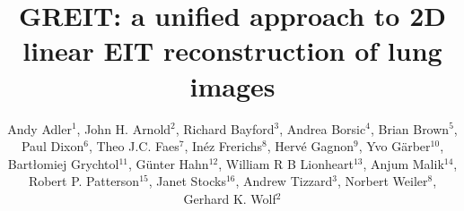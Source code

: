 \documentclass[12pt]{iopart}
\begin{document}
\title[GREIT: linear EIT image reconstruction]{%
GREIT: a unified approach to 2D linear EIT reconstruction of
       lung images
}

\author{Andy Adler$^{1}$,
        John H. Arnold$^{2}$,
        Richard Bayford$^{3}$,
        Andrea Borsic$^{4}$,
        Brian Brown$^{5}$,
        Paul Dixon$^{6}$,
        Theo J.C. Faes$^{7}$,
        In\'ez Frerichs$^{8}$,
        Herv\'e Gagnon$^{9}$,
        Yvo G\"arber$^{10}$,
        Bart\l{}omiej Grychtol$^{11}$, 
        G\"unter Hahn$^{12}$,
        William R B Lionheart$^{13}$,
        Anjum Malik$^{14}$,
        Robert P. Patterson$^{15}$,
        Janet Stocks$^{16}$,
        Andrew Tizzard$^{3}$,
        Norbert Weiler$^{8}$,
        Gerhard K. Wolf$^{2}$%
       }

\address{ $^{1}$Systems and Computer Engineering,
                Carleton University, Ottawa, Canada}
\address{ $^{2}$Division of Critical Care Medicine, Department of Anesthesia,
                Children's Hospital Boston, Harvard Medical School,
                Boston, MA, USA}
\address{ $^{3}$School of Health and Social Sciences,
                Middlesex University, London, UK}
\address{ $^{4}$School of Engineering, 
                Dartmouth College, Hanover, NH, USA}
\address{ $^{5}$Medical Physics, University of Sheffield, UK}
\address{ $^{6}$Cardinal Health Care, London, UK}
\address{ $^{7}$Department of Physics and Medical Technology,
                V.U. university medical center, Amsterdam, Netherlands}
\address{ $^{8}$Department of Anaesthesiology and Intensive Care Medicine,
                University of Schleswig-Holstein, Kiel, Germany}
\address{ $^{9}$D\'epartement de g\'enie \'electrique,
                \'Ecole Polytechnique de Montr\'eal, Canada}
\address{$^{10}$Dr\"ager Medical, L\"ubeck, Germany}
\address{$^{11}$University of Strathclyde, Glasgow, UK}
\address{$^{12}$Department of Anaesthesiological Research,
                University of G\"ottingen, Germany}
\address{$^{13}$School of Mathematics, University of Manchester, UK}
\address{$^{14}$Maltron International, Rayleigh, UK}
\address{$^{15}$Department of Biomedical Engineering,
                University of Minnesota, Minneapolis, MN, USA}
\address{$^{16}$Institute of Child Health,
                University College London, UK}
\end{document}
